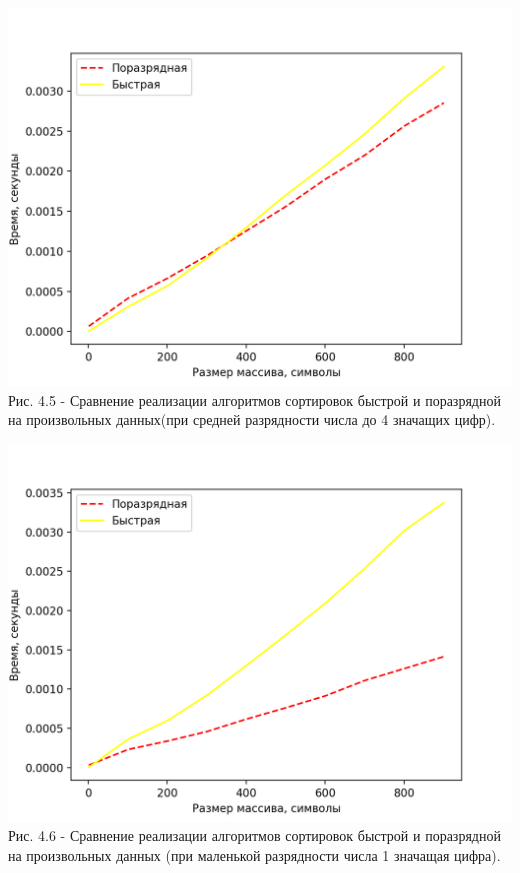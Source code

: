 	\begin{center}
        \includegraphics[scale = 1]{./pictures/graph2} \\ Рис. 4.5 - Сравнение реализации алгоритмов сортировок быстрой и поразрядной на произвольных данных(при
        средней разрядности числа до 4 значащих цифр).
	\end{center}
	\begin{center}
        \includegraphics[scale = 1]{./pictures/graph3} \\ Рис. 4.6 - Сравнение реализации алгоритмов сортировок быстрой и поразрядной на произвольных данных (при
        маленькой разрядности числа 1 значащая цифра).
	\end{center}
